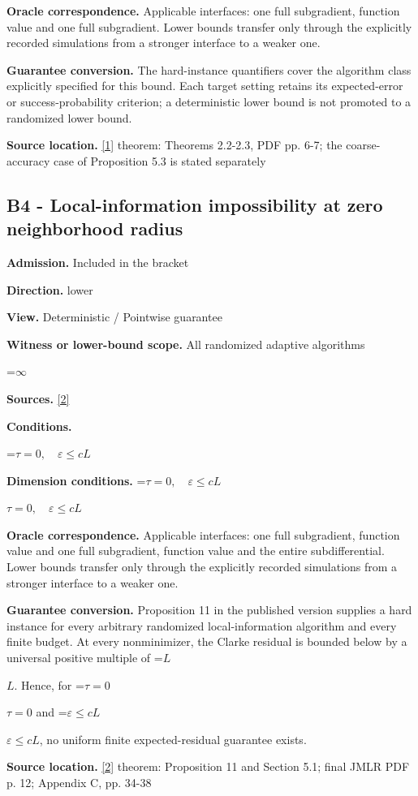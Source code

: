 \documentclass[10pt,a4paper]{article}
\newcommand{\AtlasMath}[1]{\par\begingroup\centering\setbox0=\hbox{$\displaystyle #1$}\ifdim\wd0>1.4\linewidth\typeout{ATLAS WIDE FORMULA: \the\wd0}\fi\ifdim\wd0>\linewidth\resizebox{\linewidth}{!}{\box0}\else\box0\fi\par\endgroup}
\newcommand{\AtlasInlineMath}[1]{\begingroup\setbox0=\hbox{$#1$}\ifdim\wd0>.4\linewidth\endgroup\AtlasMath{#1}\else\endgroup$#1$\fi}
\begin{document}
\textbf{Oracle correspondence.} Applicable interfaces: one full subgradient, function value and one full subgradient. Lower bounds transfer only through the explicitly recorded simulations from a stronger interface to a weaker one.

\textbf{Guarantee conversion.} The hard-instance quantifiers cover the algorithm class explicitly specified for this bound. Each target setting retains its expected-error or success-probability criterion; a deterministic lower bound is not promoted to a randomized lower bound.

\textbf{Source location.} \href{https://arxiv.org/pdf/2609.38082v2}{[1]} theorem: Theorems 2.2-2.3, PDF pp. 6-7; the coarse-accuracy case of Proposition 5.3 is stated separately

\subsection{B4 - Local-information impossibility at zero neighborhood radius}
\textbf{Admission.} Included in the bracket

\textbf{Direction.} lower

\textbf{View.} Deterministic / Pointwise guarantee

\textbf{Witness or lower-bound scope.} All randomized adaptive algorithms

\AtlasMath{\infty}
\textbf{Sources.} \href{https://www.jmlr.org/papers/volume23/21-1507/21-1507.pdf}{[2]}

\textbf{Conditions.} 
\AtlasMath{\tau=0,\quad\varepsilon\le cL}


\textbf{Dimension conditions.} \AtlasInlineMath{\tau=0,\quad\varepsilon\le cL}

\textbf{Oracle correspondence.} Applicable interfaces: one full subgradient, function value and one full subgradient, function value and the entire subdifferential. Lower bounds transfer only through the explicitly recorded simulations from a stronger interface to a weaker one.

\textbf{Guarantee conversion.} Proposition 11 in the published version supplies a hard instance for every arbitrary randomized local-information algorithm and every finite budget. At every nonminimizer, the Clarke residual is bounded below by a universal positive multiple of \AtlasInlineMath{L}. Hence, for \AtlasInlineMath{\tau=0} and \AtlasInlineMath{\varepsilon\le cL}, no uniform finite expected-residual guarantee exists.

\textbf{Source location.} \href{https://www.jmlr.org/papers/volume23/21-1507/21-1507.pdf}{[2]} theorem: Proposition 11 and Section 5.1; final JMLR PDF p. 12; Appendix C, pp. 34-38
\end{document}
